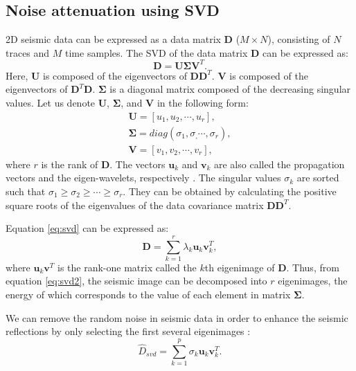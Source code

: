 \subsection{Noise attenuation using SVD}
2D seismic data can be expressed as a data matrix $\mathbf{D}$ ($M\times N$), consisting of $N$ traces and $M$ time samples. The SVD of the data matrix $\mathbf{D}$ can be expressed as:
\begin{equation}
\label{eq:svd}
\mathbf{D}=\mathbf{U\Sigma V}^T.
\end{equation}
Here, $\mathbf{U}$ is composed of the eigenvectors of $\mathbf{DD}^T$. $\mathbf{V}$ is composed of the eigenvectors of $\mathbf{D}^T\mathbf{D}$. $\mathbf{\Sigma}$ is a diagonal matrix composed of the decreasing singular values. Let us denote $\mathbf{U}$, $\mathbf{\Sigma}$, and $\mathbf{V}$ in the following form:
\begin{equation}
\label{eq:svdu}
\begin{array}{l}
\mathbf{U}=[u_1,u_2,\cdots,u_r],\\
\mathbf{\Sigma}=diag(\sigma_1,\sigma_,\cdots,\sigma_r),\\
\mathbf{V}=[v_1,v_2,\cdots,v_r],
\end{array}
\end{equation}
where $r$ is the rank of $\mathbf{D}$. The vectors $\mathbf{u}_k$ and $\mathbf{v}_k$ are also called the propagation vectors and the eigen-wavelets, respectively \cite[]{vrabie2004}. The singular values $\sigma_k$ are sorted such that $\sigma_1\ge\sigma_2\ge\cdots\ge\sigma_r$. They can be obtained by calculating the positive square roots of the eigenvalues of the data covariance matrix $\mathbf{D}\mathbf{D}^T$.

Equation \ref{eq:svd} can be expressed as:
\begin{equation}
\label{eq:svd2}
\mathbf{D} = \sum_{k=1}^{r}\lambda_k\mathbf{u}_k\mathbf{v}^T_{k},
\end{equation}
where $\mathbf{u}_k\mathbf{v}^T$ is the rank-one matrix called the $k$th eigenimage of $\mathbf{D}$. Thus, from equation \ref{eq:svd2}, the seismic image can be decomposed into $r$ eigenimages, %
the energy of which corresponds to the value of each element in matrix $\mathbf{\Sigma}$. 

We can remove the random noise in seismic data in order to enhance the seismic reflections by only selecting the first several eigenimages \cite[]{freire1988svdsnr}:
\begin{equation}
\label{eq:svddenoise}
\hat{D}_{svd} = \sum_{k=1}^{p} \sigma_k\mathbf{u}_k\mathbf{v}_k^T.
\end{equation}

